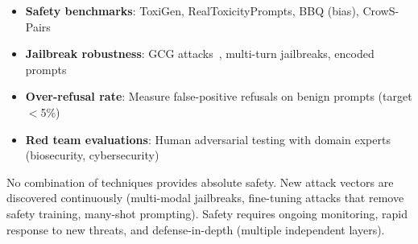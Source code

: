 \begin{itemize}
  \item \textbf{Safety benchmarks}: ToxiGen, RealToxicityPrompts, BBQ (bias), CrowS-Pairs
  \item \textbf{Jailbreak robustness}: GCG attacks~\cite{zou2023universal}, multi-turn jailbreaks, encoded prompts
  \item \textbf{Over-refusal rate}: Measure false-positive refusals on benign prompts (target $<$5\%)
  \item \textbf{Red team evaluations}: Human adversarial testing with domain experts (biosecurity, cybersecurity)
\end{itemize}

\begin{warningbox}
No combination of techniques provides absolute safety. New attack vectors are discovered continuously (multi-modal jailbreaks, fine-tuning attacks that remove safety training, many-shot prompting). Safety requires ongoing monitoring, rapid response to new threats, and defense-in-depth (multiple independent layers).
\end{warningbox}

